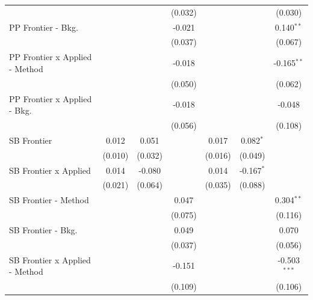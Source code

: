 \begin{tabular}{lcccccc}
                                  &              &              & (0.032)       &         &               & (0.030)\\   
   PP Frontier - Bkg.             &              &              & -0.021        &         &               & 0.140$^{**}$\\   
                                  &              &              & (0.037)       &         &               & (0.067)\\   
   PP Frontier x Applied - Method &              &              & -0.018        &         &               & -0.165$^{**}$\\   
                                  &              &              & (0.050)       &         &               & (0.062)\\   
   PP Frontier x Applied - Bkg.   &              &              & -0.018        &         &               & -0.048\\   
                                  &              &              & (0.056)       &         &               & (0.108)\\   
   SB Frontier                    & 0.012        & 0.051        &               & 0.017   & 0.082$^{*}$   &   \\   
                                  & (0.010)      & (0.032)      &               & (0.016) & (0.049)       &   \\   
   SB Frontier x Applied          & 0.014        & -0.080       &               & 0.014   & -0.167$^{*}$  &   \\   
                                  & (0.021)      & (0.064)      &               & (0.035) & (0.088)       &   \\   
   SB Frontier - Method           &              &              & 0.047         &         &               & 0.304$^{**}$\\   
                                  &              &              & (0.075)       &         &               & (0.116)\\   
   SB Frontier - Bkg.             &              &              & 0.049         &         &               & 0.070\\   
                                  &              &              & (0.037)       &         &               & (0.056)\\   
   SB Frontier x Applied - Method &              &              & -0.151        &         &               & -0.503$^{***}$\\   
                                  &              &              & (0.109)       &         &               & (0.106)\\   

\end{tabular}
